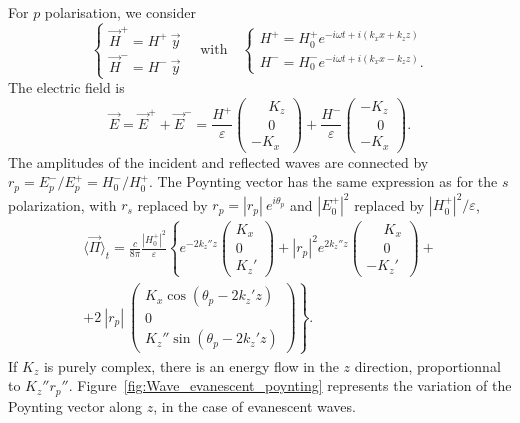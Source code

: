For $p$ polarisation, we consider 
$$
\left\{
\begin{array}{l}
\vec H^+ = H^+\ \vec y \\
\vec H^- = H^-\ \vec y
\end{array}
\right.
\quad\mathrm{with}\quad
\left\{
\begin{array}{l}
H^+ = H_0^+ e^{-i\omega t + i(k_x x + k_z z)}  \\
H^- = H_0^- e^{-i\omega t + i(k_x x - k_z z)}.
\end{array}
\right.
$$
The electric field is
\begin{equation}
\vec E = \vec E^+ + \vec E^- = 
\frac{H^+}{\varepsilon}
\begin{pmatrix}
\phantom{-} K_z \\
\phantom{-} 0 \\
- K_x 
\end{pmatrix}
+
\frac{H^-}{\varepsilon}
\begin{pmatrix}
- K_z \\
\phantom{-} 0 \\
- K_x 
\end{pmatrix}.
\label{eq:p-wave-superposition}
\end{equation}
The amplitudes of the incident and reflected waves are connected by $r_p = E_p^- / E_p^+ = H_0^- / H_0^+$.
The Poynting vector has the same expression as for the $s$ polarization, with $r_s$ replaced by $r_p = |r_p|\ e^{i\theta_{p}}$ and $|E_0^+|^2$ replaced by $|H_0^+|^2/\varepsilon$,
\begin{align*}
\langle \vec{\Pi} \rangle_t = 
\frac{c}{8\pi} \frac{|H_0^+|^2}{\varepsilon} \left\{
e^{-2 k_z'' z} 
\begin{pmatrix}
K_x \\
0 \\
K_z'
\end{pmatrix}
+ 
|r_p|^2
e^{2 k_z'' z}
\begin{pmatrix}
\phantom{-} K_x \\
\phantom{-} 0 \\
-K_z'
\end{pmatrix}
+ \right.\\
\left. +
2\ |r_p|\ 
\begin{pmatrix}
K_x \cos(\theta_{p} - 2 k_z' z)\\
0 \\
K_z'' \sin(\theta_{p} - 2 k_z' z)
\end{pmatrix}
\right\}.
\end{align*}
If $K_z$ is purely complex, there is an energy flow in the $z$ direction, proportionnal to $K_z'' r_p''$.
Figure~\ref{fig:Wave_evanescent_poynting} represents the variation of the Poynting vector along $z$, in the case of evanescent waves.

